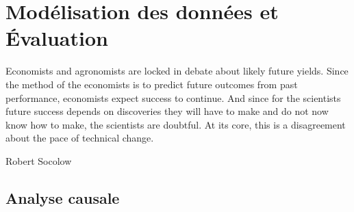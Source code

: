 \chapter{Modélisation des données et Évaluation}
\epigraph{Economists and agronomists are locked in debate about likely
future yields. Since the method of the economists is to predict
future outcomes from past performance, economists expect
success to continue. And since for the scientists future success
depends on discoveries they will have to make and do not now
know how to make, the scientists are doubtful. At its core, this is
a disagreement about the pace of technical change.}{Robert
Socolow}
\cleardoublepage

	\section{Analyse causale}
		\shorthandoff{!}
		\lstset{language=R}
		\shorthandon{!}
